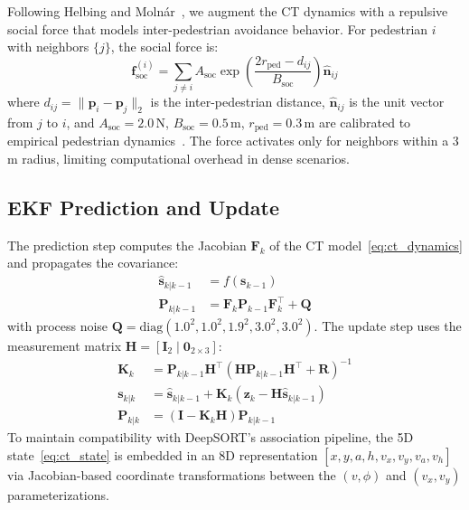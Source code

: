 \documentclass[conference]{IEEEtran}
\begin{document}
Following Helbing and Moln\'{a}r~\cite{helbing1995social}, we augment the CT dynamics with a repulsive social force that models inter-pedestrian avoidance behavior. For pedestrian $i$ with neighbors $\{j\}$, the social force is:
\begin{equation}
    \mathbf{f}_{\text{soc}}^{(i)} = \sum_{j \neq i} A_{\text{soc}} \exp\!\left(\frac{2r_{\text{ped}} - d_{ij}}{B_{\text{soc}}}\right) \hat{\mathbf{n}}_{ij}
    \label{eq:social_force}
\end{equation}
where $d_{ij} = \|\mathbf{p}_i - \mathbf{p}_j\|_2$ is the inter-pedestrian distance, $\hat{\mathbf{n}}_{ij}$ is the unit vector from $j$ to $i$, and $A_{\text{soc}} = 2.0$\,N, $B_{\text{soc}} = 0.5$\,m, $r_{\text{ped}} = 0.3$\,m are calibrated to empirical pedestrian dynamics~\cite{helbing1995social}. The force activates only for neighbors within a 3\,m radius, limiting computational overhead in dense scenarios.

\subsection{EKF Prediction and Update}

The prediction step computes the Jacobian $\mathbf{F}_k$ of the CT model~\eqref{eq:ct_dynamics} and propagates the covariance:
\begin{align}
    \hat{\mathbf{s}}_{k|k-1} &= f(\mathbf{s}_{k-1}) \label{eq:ekf_predict_mean} \\
    \mathbf{P}_{k|k-1} &= \mathbf{F}_k \mathbf{P}_{k-1} \mathbf{F}_k^\top + \mathbf{Q} \label{eq:ekf_predict_cov}
\end{align}
with process noise $\mathbf{Q} = \mathrm{diag}(1.0^2, 1.0^2, 1.9^2, 3.0^2, 3.0^2)$.
The update step uses the measurement matrix $\mathbf{H} = [\mathbf{I}_2 \mid \mathbf{0}_{2\times3}]$:
\begin{align}
    \mathbf{K}_k &= \mathbf{P}_{k|k-1}\mathbf{H}^\top(\mathbf{H}\mathbf{P}_{k|k-1}\mathbf{H}^\top + \mathbf{R})^{-1} \\
    \mathbf{s}_{k|k} &= \hat{\mathbf{s}}_{k|k-1} + \mathbf{K}_k(\mathbf{z}_k - \mathbf{H}\hat{\mathbf{s}}_{k|k-1}) \\
    \mathbf{P}_{k|k} &= (\mathbf{I} - \mathbf{K}_k\mathbf{H})\mathbf{P}_{k|k-1}
\end{align}
To maintain compatibility with DeepSORT's association pipeline, the 5D state~\eqref{eq:ct_state} is embedded in an 8D representation $[x, y, a, h, v_x, v_y, v_a, v_h]$ via Jacobian-based coordinate transformations between the $(v, \phi)$ and $(v_x, v_y)$ parameterizations.
\end{document}
